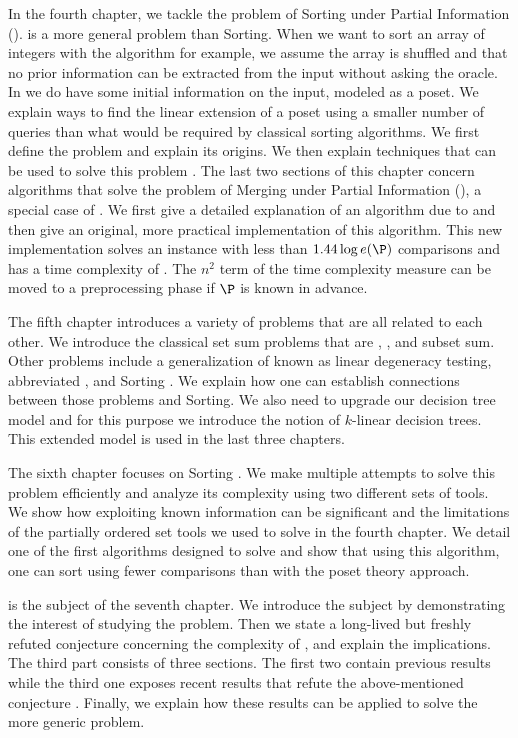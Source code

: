 In the fourth chapter, we tackle the problem of Sorting under Partial
Information (\SUPI). \SUPI is
a more general problem than Sorting. When we want to sort an array of integers
with the \quicksort algorithm for example, we assume the array is shuffled and
that no prior information can be extracted from the input without asking the
oracle. In \SUPI we do have some initial information on the input, modeled as a
poset. We explain ways
to find the linear extension of a poset using a smaller number of queries than
what would be required by classical sorting algorithms. We first define
the problem and explain its origins. We then explain techniques that can
be used to solve this problem \cite{kahn:1995,cardinal:2013}. The
last two sections of this chapter concern
algorithms that solve the problem of Merging under Partial Information
(\MUPI), a special case of \SUPI. We first
give a detailed explanation of an algorithm due to \citet*{linial:1984} and
then give an original, more practical implementation of this algorithm. This
new implementation solves an \MUPI instance with less than \(1.44 \log e(\P)\)
comparisons and has a time complexity of . The
\(n^2\) term of the time complexity measure can be moved to a preprocessing
phase if \(\P\) is known in advance.

The fifth chapter introduces a variety of problems that are all related to
each other. We introduce the classical set sum problems that are
\threeSUM, \kSUM, and subset sum. Other problems include a generalization of
\kSUM known as linear degeneracy testing, abbreviated \kLDT, and Sorting \XY.
We explain how one can establish connections between those problems and
Sorting. We also need to upgrade our decision tree model and for this
purpose we introduce the notion of \(k\)-linear decision trees. This
extended model is used in the last three chapters.

The sixth chapter focuses on Sorting \XY. We make
multiple attempts to solve this problem efficiently and analyze its complexity
using two different sets of tools. We show how exploiting known information
can be significant and the limitations of the partially ordered set tools
we used to solve \SUPI in the fourth chapter. We
detail one of the first algorithms designed to solve \SUPI
\cite{fredman:1976} and
show that using this algorithm, one can sort \XY
using fewer comparisons than with the poset theory approach.

\threeSUM is the subject of the seventh chapter. We introduce the
subject by demonstrating the interest of studying the \threeSUM problem. Then
we state a long-lived but freshly refuted conjecture concerning the
complexity of \threeSUM, and explain the implications. The third part
consists of three sections. The first two contain previous results
\cite{erickson:1999,ailon:2005} while
the third one exposes recent results that refute the above-mentioned
conjecture \cite{gronlund:2014}. Finally, we explain how these results can be applied to solve
the more generic \kLDT problem.

